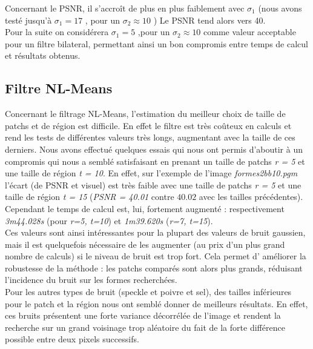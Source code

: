 \documentclass[a4,12pt]{article}
\begin{document}
\hspace{2em}

Concernant le PSNR, il s'accroît de plus en plus faiblement avec $\sigma_1$ (nous avons testé jusqu'à $\sigma_1 = 17$ , pour un $\sigma_2 \approx 10$ )
Le PSNR tend alors vers 40.\\
Pour la suite on considérera  $\sigma_1 = 5$ ,pour un $\sigma_2 \approx 10$ comme valeur acceptable pour un filtre bilateral, permettant ainsi un bon compromis entre temps de calcul et résultats obtenus.

\subsection{Filtre NL-Means}
Concernant le filtrage NL-Means, l'estimation du meilleur choix de taille de patchs et de région est difficile. En effet le filtre est très coûteux en calculs et rend les tests de différentes valeurs très longs, augmentant avec la taille de ces derniers. Nous avons effectué quelques essais qui nous ont permis d'aboutir à un compromis qui nous a semblé satisfaisant en prenant un taille de patchs \textit{r = 5} et une taille de région \textit{t = 10}. En effet, sur l'exemple de l'image \textit{formes2bb10.pgm} l'écart (de PSNR et visuel) est très faible avec une taille de patchs \textit{r = 5} et une taille de région \textit{t = 15} (\textit{PSNR = 40.01} contre $40.02$ avec les tailles précédentes). Cependant le temps de calcul est, lui, fortement augmenté : respectivement \textit{3m44.028s} (pour \textit{r=5, t=10}) et \textit{1m39.620s} (\textit{r=7, t=15}).\\

Ces valeurs sont ainsi intéressantes pour la plupart des valeurs de bruit gaussien, mais il est quelquefois nécessaire de les augmenter (au prix d'un plus grand nombre de calculs) si le niveau de bruit est trop fort. Cela permet d' améliorer la robustesse de la méthode : les patchs comparés sont alors plus grands, réduisant l'incidence du bruit sur les formes recherchées.\\

Pour les autres types de bruit (speckle et poivre et sel), des tailles inférieures pour le patch et la région nous ont semblé donner de meilleurs résultats. En effet, ces bruits présentent une forte variance décorrélée de l'image et rendent la recherche sur un grand voisinage trop aléatoire du fait de la forte différence possible entre deux pixels successifs.\\
\end{document}
